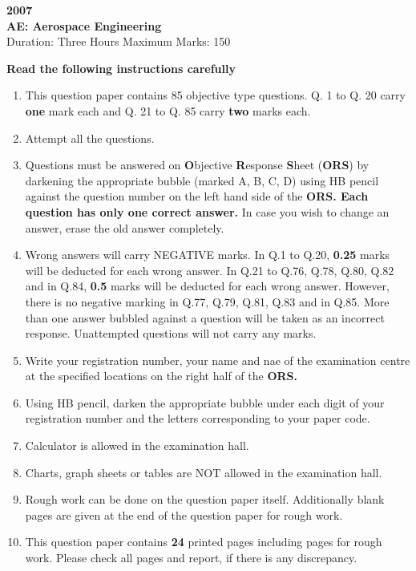 \documentclass{article}
\begin{document}
\begin{center}
    \textbf{2007}\\
    \textbf{AE: Aerospace Engineering}\\
\vspace{0.5cm}
Duration: Three Hours \hfill Maximum Marks: 150
\end{center}

\begin{center}
    \textbf{Read the following instructions carefully}
\end{center}
\begin{enumerate}
    \item This question paper contains 85 objective type questions. Q. 1 to Q. 20 carry \textbf{one} mark each and Q. 21 to Q. 85 carry \textbf{two} marks each.
    \item Attempt all the questions.
    \item Questions must be answered on \textbf{O}bjective \textbf{R}esponse \textbf{S}heet (\textbf{ORS}) by darkening the appropriate bubble (marked A, B, C, D) using HB pencil against the question number on the left hand side of the \textbf{ORS. Each question has only one correct answer.} In case you wish to change an answer, erase the old answer completely.
    \item Wrong answers will carry NEGATIVE marks. In Q.1 to Q.20, \textbf{0.25} marks will be deducted for each wrong answer. In Q.21 to Q.76, Q.78, Q.80, Q.82 and in Q.84, \textbf{0.5} marks will be deducted for each wrong answer. However, there is no negative marking in Q.77, Q.79, Q.81, Q.83 and in Q.85. More than one answer bubbled against a question will be taken as an incorrect response. Unattempted questions  will not carry any marks.
    \item Write your registration number, your name and nae of the examination centre at the specified locations on the right half of the \textbf{ORS.}
    \item Using HB pencil, darken the appropriate bubble under each digit of your registration number and the letters corresponding to your paper code.
    \item Calculator is allowed in the examination hall.
    \item Charts, graph sheets or tables are NOT allowed in the examination hall.
    \item Rough work can be done on the question paper itself. Additionally blank pages are given at the end of the question paper for rough work.
    \item This question paper contains \textbf{24} printed pages including pages for rough work. Please check all pages and report, if there is any discrepancy.
\end{enumerate}
\end{document}
